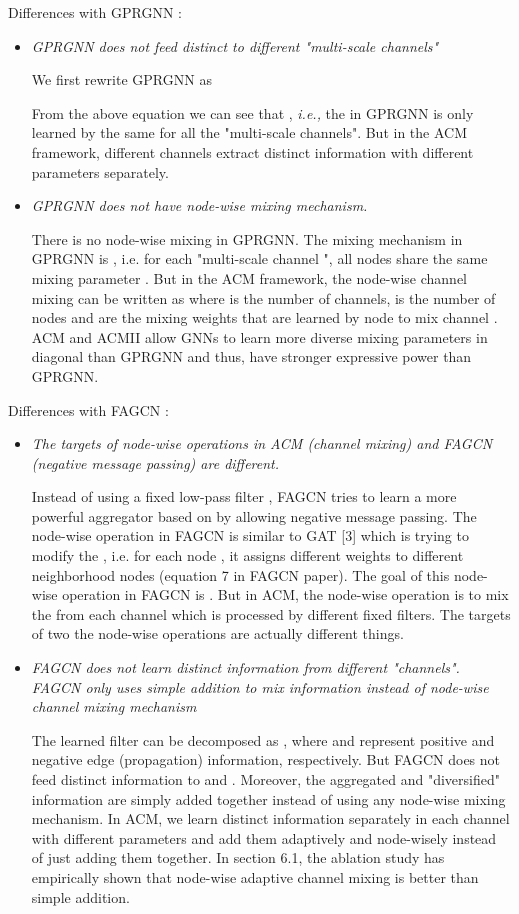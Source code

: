 \documentclass{article}
\newcommand\ie{\textit{i.e.,}}
\newcommand{\0}{{\boldsymbol{0}}}
\newcommand{\6}{{\partial}}
\newcommand{\8}{{\infty}}
\newcommand{\4}{{\nabla}}
\begin{document}
Differences with GPRGNN \cite{chien2021adaptive}:
\begin{itemize}
    \item \emph{GPRGNN does not feed distinct  to different "multi-scale channels"}
    
    We first rewrite GPRGNN as 
 
From the above equation we can see that , \ie{} the  in GPRGNN is only learned by the same  for all the "multi-scale channels". But in the ACM framework, different channels extract distinct information with different parameters separately.

    \item \emph{GPRGNN does not have node-wise mixing mechanism.}
    
There is no node-wise mixing in GPRGNN. The mixing mechanism in GPRGNN is , i.e. for each "multi-scale channel ", all nodes share the same mixing parameter . But in the ACM framework, the node-wise channel mixing can be written as  where  is the number of channels,  is the number of nodes and  are the mixing weights that are learned by node  to mix channel . ACM and ACMII allow GNNs to learn more diverse mixing parameters in diagonal than GPRGNN and thus, have stronger expressive power than GPRGNN.
\end{itemize}

Differences with FAGCN \cite{bo2021beyond}:
\begin{itemize}
    \item  \emph{The targets of node-wise operations in ACM (channel mixing) and FAGCN (negative message passing) are different.}
    
   Instead of using a fixed low-pass filter , FAGCN tries to learn a more powerful aggregator  based on  by allowing negative message passing. The node-wise operation in FAGCN is similar to GAT [3] which is trying to modify the , i.e. for each node , it assigns different weights  to different neighborhood nodes (equation 7 in FAGCN paper). The goal of this node-wise operation in FAGCN is . But in ACM, the node-wise operation is to mix the  from each channel which is processed by different fixed filters. The targets of two the node-wise operations are actually different things.
    \item \emph{FAGCN does not learn distinct information from different "channels". FAGCN only uses simple addition to mix information instead of node-wise channel mixing mechanism}
    
   The learned filter  can be decomposed as , where  and  represent  positive and negative edge (propagation) information, respectively. But FAGCN does not feed distinct information to  and . Moreover, the aggregated  and "diversified" information  are simply added together instead of using any node-wise mixing mechanism. In ACM, we learn distinct information separately in each channel with different parameters and add them adaptively and node-wisely instead of just adding them together. In section 6.1, the ablation study has empirically shown that node-wise adaptive channel mixing is better than simple addition.
\end{itemize}
\end{document}

